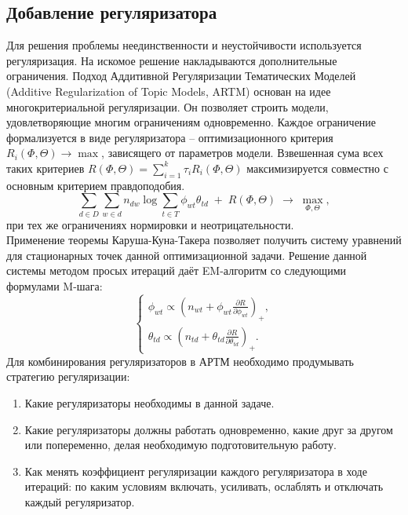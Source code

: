 \documentclass[12pt]{article}
\begin{document}
	\subsection{Добавление регуляризатора}
Для решения проблемы неединственности и неустойчивости используется регуляризация. На искомое решение накладываются дополнительные ограничения. Подход Аддитивной Регуляризации Тематических Моделей  (Additive Regularization of Topic Models, ARTM) \cite{artmdef1, artmdef2, artmdef3} основан на идее многокритериальной регуляризации. Он позволяет строить модели, удовлетворяющие многим ограничениям одновременно. Каждое ограничение формализуется в виде регуляризатора -- оптимизационного критерия $R_i(\Phi,\Theta)\to\max$, зависящего от параметров модели. Взвешенная сума всех таких критериев $R(\Phi,\Theta) = \sum_{i=1}^k \tau_i R_i(\Phi,\Theta)$ максимизируется совместно с основным критерием правдоподобия.
\[
\sum_{d\in D} \sum_{w\in d} n_{dw}\log \sum_{t\in T} \phi_{wt}\theta_{td} \;+\; R(\Phi,\Theta)\;\to\; \max_{\Phi,\Theta},
\]
при тех же ограничениях нормировки и неотрицательности.\\
Применение теоремы Каруша-Куна-Такера позволяет получить систему уравнений для стационарных точек данной оптимизационной задачи. Решение данной системы методом просых итераций даёт EM-алгоритм со следующими формулами M-шага:
\[
\left\{
	\begin{aligned}
\phi_{wt} \propto  \left(n_{wt} + \phi_{wt}\frac{\partial R}{\partial\phi_{wt}}\right)_{+},\\
\theta_{td} \propto  \left(n_{td} + \theta_{td}\frac{\partial R}{\partial\theta_{td}}\right)_{+}.
	\end{aligned}
\right.
\]
Для комбинирования регуляризаторов в АРТМ необходимо продумывать стратегию регуляризации:
\begin{enumerate}
\item Какие регуляризаторы необходимы в данной задаче.
\item Какие регуляризаторы должны работать одновременно, какие друг за другом или попеременно, делая необходимую подготовительную работу.
\item Как менять коэффициент регуляризации каждого регуляризатора в ходе итераций: по каким условиям включать, усиливать, ослаблять и отключать каждый регуляризатор.
\end{enumerate}
\end{document}
